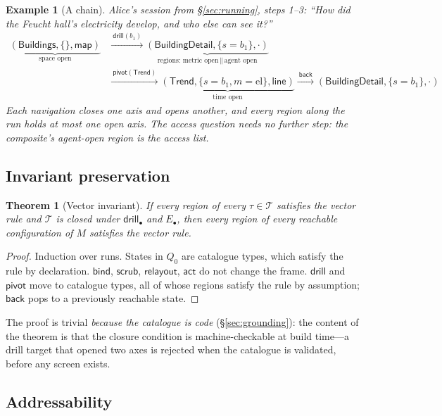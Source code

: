\documentclass[11pt,a4paper]{article}
\newtheorem{theorem}{Theorem}[section]
\newtheorem{example}{Example}[section]
\theoremstyle{remark}
\newcommand{\vbind}{\mathsf{bind}}
\newcommand{\vscrub}{\mathsf{scrub}}
\newcommand{\vdrill}{\mathsf{drill}}
\newcommand{\vpivot}{\mathsf{pivot}}
\newcommand{\vrelayout}{\mathsf{relayout}}
\newcommand{\vact}{\mathsf{act}}
\newcommand{\vback}{\mathsf{back}}
\newcommand{\TT}{\mathcal{T}}                    %
\begin{document}
\begin{example}[A chain]\label{ex:chain}
Alice's session from \S\ref{sec:running}, steps 1--3:
\emph{``How did the Feucht hall's electricity develop, and who else can see it?''}
\begin{align*}
\underbrace{(\textsf{Buildings}, \{\}, \textsf{map})}_{\text{space open}}
&\xrightarrow{\ \vdrill(b_1)\ }
\underbrace{(\textsf{BuildingDetail}, \{s{=}b_1\}, \cdot)}_{\text{regions: metric open} \,\|\, \text{agent open}} \\
&\xrightarrow{\ \vpivot(\textsf{Trend})\ }
\underbrace{(\textsf{Trend}, \{s{=}b_1, m{=}\mathrm{el}\}, \textsf{line})}_{\text{time open}}
\xrightarrow{\ \vback\ }
(\textsf{BuildingDetail}, \{s{=}b_1\}, \cdot)
\end{align*}
Each navigation closes one axis and opens another, and every region along the
run holds at most one open axis. The access question needs no further step: the
composite's agent-open region \emph{is} the access list.
\end{example}

\subsection{Invariant preservation}

\begin{theorem}[Vector invariant]\label{thm:invariant}
If every region of every $\tau \in \TT$ satisfies the vector rule and $\TT$ is
closed under $\vdrill_\bullet$ and $E_\bullet$, then every region of every
reachable configuration of $M$ satisfies the vector rule.
\end{theorem}

\begin{proof}
Induction over runs. States in $Q_0$ are catalogue types, which satisfy the rule by
declaration. $\vbind$, $\vscrub$, $\vrelayout$, $\vact$ do not change the frame.
$\vdrill$ and $\vpivot$ move to catalogue types, all of whose regions satisfy
the rule by assumption; $\vback$ pops to a previously reachable state.
\end{proof}

The proof is trivial \emph{because the catalogue is code} (\S\ref{sec:grounding}):
the content of the theorem is that the closure condition is machine-checkable at
build time---a drill target that opened two axes is rejected when the catalogue is
validated, before any screen exists.

\subsection{Addressability}\label{sec:addr}
\end{document}
